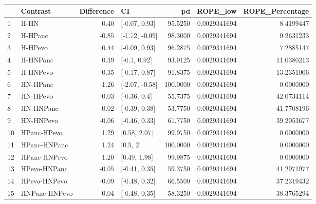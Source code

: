 \begin{table}[ht]
\centering
\begin{tabular}{llrlrrr}
  \hline
 & Contrast & Difference & CI & pd & ROPE\_low & ROPE\_Percentage \\ 
  \hline
1 & H-HN & 0.40 & [-0.07, 0.93] & 95.5250 & 0.0029341694 & 8.4199447 \\ 
  2 & H-HPanc & -0.85 & [-1.72, -0.09] & 98.3000 & 0.0029341694 & 0.2631233 \\ 
  3 & H-HPevo & 0.44 & [-0.09, 0.93] & 96.2875 & 0.0029341694 & 7.2885147 \\ 
  4 & H-HNPanc & 0.39 & [-0.1, 0.92] & 93.9125 & 0.0029341694 & 11.0380213 \\ 
  5 & H-HNPevo & 0.35 & [-0.17, 0.87] & 91.8375 & 0.0029341694 & 13.2351006 \\ 
  6 & HN-HPanc & -1.26 & [-2.07, -0.58] & 100.0000 & 0.0029341694 & 0.0000000 \\ 
  7 & HN-HPevo & 0.03 & [-0.36, 0.4] & 55.7375 & 0.0029341694 & 42.0734114 \\ 
  8 & HN-HNPanc & -0.02 & [-0.39, 0.38] & 53.7750 & 0.0029341694 & 41.7708196 \\ 
  9 & HN-HNPevo & -0.06 & [-0.46, 0.33] & 61.7750 & 0.0029341694 & 39.2053677 \\ 
  10 & HPanc-HPevo & 1.29 & [0.58, 2.07] & 99.9750 & 0.0029341694 & 0.0000000 \\ 
  11 & HPanc-HNPanc & 1.24 & [0.5, 2] & 100.0000 & 0.0029341694 & 0.0000000 \\ 
  12 & HPanc-HNPevo & 1.20 & [0.49, 1.98] & 99.9875 & 0.0029341694 & 0.0000000 \\ 
  13 & HPevo-HNPanc & -0.05 & [-0.41, 0.35] & 59.3750 & 0.0029341694 & 41.2971977 \\ 
  14 & HPevo-HNPevo & -0.09 & [-0.48, 0.32] & 66.5500 & 0.0029341694 & 37.2319432 \\ 
  15 & HNPanc-HNPevo & -0.04 & [-0.48, 0.35] & 58.3250 & 0.0029341694 & 38.3765294 \\ 
   \hline
\end{tabular}
\end{table}

